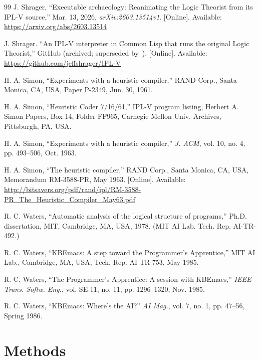 \documentclass[11pt]{article}
\begin{document}
\begin{thebibliography}{99}
 J. Shrager,
  ``Executable archaeology: Reanimating the Logic Theorist
  from its IPL-V source,''
  Mar. 13, 2026, \textit{arXiv:2603.13514v1}. [Online]. Available:
  \url{https://arxiv.org/abs/2603.13514}

 J. Shrager. ``An IPL-V interpreter in Common Lisp
  that runs the original Logic Theorist,'' GitHub (archived; superseded
  by~\cite{earepo}). [Online]. Available:
  \url{https://github.com/jeffshrager/IPL-V}

 H. A. Simon, ``Experiments with a heuristic
  compiler,'' RAND Corp., Santa Monica, CA, USA, Paper P-2349, Jun. 30,
  1961.

 H. A. Simon, ``Heuristic Coder 7/16/61,''
  IPL-V program listing, Herbert A. Simon Papers, Box 14, Folder FF965,
  Carnegie Mellon Univ. Archives, Pittsburgh, PA, USA.

 H. A. Simon, ``Experiments with a heuristic
  compiler,'' \textit{J. ACM}, vol. 10, no. 4, pp. 493--506, Oct. 1963.

 H. A. Simon, ``The heuristic compiler,'' RAND
  Corp., Santa Monica, CA, USA, Memorandum RM-3588-PR, May 1963.
  [Online]. Available:
  \url{http://bitsavers.org/pdf/rand/ipl/RM-3588-PR_The_Heuristic_Compiler_May63.pdf}

 R. C. Waters, ``Automatic analysis of the logical
  structure of programs,'' Ph.D. dissertation, MIT, Cambridge, MA, USA,
  1978. (MIT AI Lab. Tech. Rep. AI-TR-492.)

 R. C. Waters, ``KBEmacs: A step toward the
  Programmer's Apprentice,'' MIT AI Lab., Cambridge, MA, USA, Tech. Rep.
  AI-TR-753, May 1985.

 R. C. Waters, ``The Programmer's Apprentice: A
  session with KBEmacs,'' \textit{IEEE Trans. Softw. Eng.}, vol. SE-11,
  no. 11, pp. 1296--1320, Nov. 1985.

 R. C. Waters, ``KBEmacs: Where's the AI?''
  \textit{AI Mag.}, vol. 7, no. 1, pp. 47--56, Spring 1986.

\end{thebibliography}

\appendix
\section{Methods}
\label{app:methods}
\end{document}
